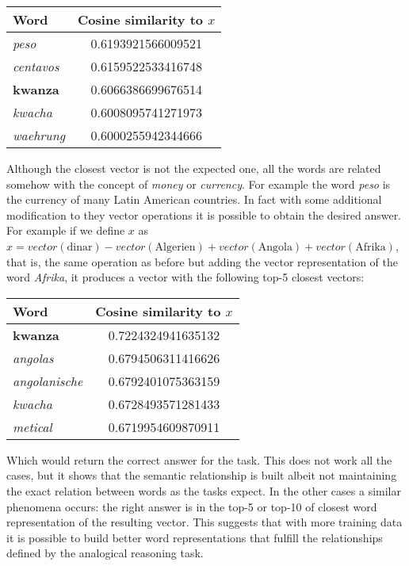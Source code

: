 \begin{center}
\small
\begin{tabular}{|l|c|}
 \hline
 Word             &  Cosine similarity to $x$  \\
\hline
 \textit{peso}           &      0.6193921566009521  \\
 \textit{centavos}       &      0.6159522533416748  \\
 \textbf{kwanza}         &      0.6066386699676514  \\
 \textit{kwacha}         &      0.6008095741271973  \\
 \textit{waehrung}       &      0.6000255942344666  \\
\hline
\end{tabular}
\end{center}


Although the closest vector is not the expected one, all the words are related
somehow with the concept of \textit{money} or \textit{currency}.  For example
the word \textit{peso} is the currency of many Latin American countries. In
fact with some additional modification  to they vector operations it is
possible to obtain the desired answer. For example if we define $x$ as  $x = vector(\text{dinar}) -
vector(\text{Algerien}) + vector(\text{Angola})  + vector(\text{Afrika}) $,
that is, the same operation as before but adding the vector representation of
the word \textit{Afrika}, it produces a vector with the following top-5 closest
vectors:


\begin{center}
\small
\begin{tabular}{|l|c|}
 \hline
 Word                 &  Cosine similarity to $x$  \\
\hline
\textbf{kwanza}        &        0.7224324941635132  \\
 \emph{angolas}       &        0.6794506311416626  \\
 \emph{angolanische}  &        0.6792401075363159  \\
 \emph{kwacha}        &        0.6728493571281433  \\
 \emph{metical}       &        0.6719954609870911  \\
\hline
\end{tabular}
\end{center}

Which would return the correct answer for the task. This does not work all
the cases, but it shows that the semantic relationship is built albeit not
maintaining the exact relation between words as the tasks expect. In the
other cases  a similar phenomena occurs: the right answer is in the
top-5 or top-10 of closest word representation  of  the resulting vector. This suggests 
that with more training data it is possible to build better word
representations  that fulfill the relationships defined  by the analogical
reasoning task.



